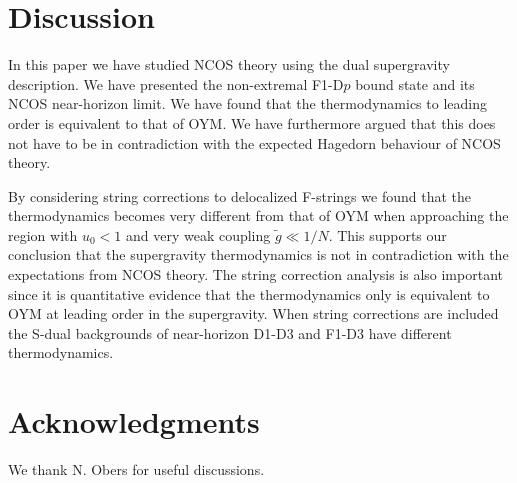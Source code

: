 \documentclass[a4paper,twoside,titlepage,12pt]{article}
\begin{document}
\section{Discussion}

In this paper we have studied NCOS theory using the 
dual supergravity description.
We have presented the non-extremal F1-D$p$ bound state 
and its NCOS near-horizon limit.
We have found that the thermodynamics to leading order is 
equivalent to that of OYM.
We have furthermore argued that this does not have to be in contradiction
with the expected Hagedorn behaviour of NCOS theory.

By considering string corrections to delocalized F-strings we found
that the thermodynamics becomes very different from that of OYM
when approaching the region with $u_0 < 1$ and very weak coupling
$\tilde{g} \ll 1/N $. This supports our conclusion that the supergravity
thermodynamics is not in contradiction with the expectations from NCOS theory.
The string correction analysis is also important since it is quantitative 
evidence that the thermodynamics only is equivalent to
OYM at leading order
in the supergravity. When string corrections are included
the S-dual backgrounds of near-horizon D1-D3 and F1-D3 have 
different thermodynamics.



\section*{Acknowledgments}

We thank N. Obers for useful discussions.



%
%
\end{document}
